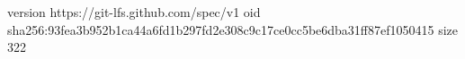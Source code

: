 version https://git-lfs.github.com/spec/v1
oid sha256:93fea3b952b1ca44a6fd1b297fd2e308c9c17ce0cc5be6dba31ff87ef1050415
size 322
